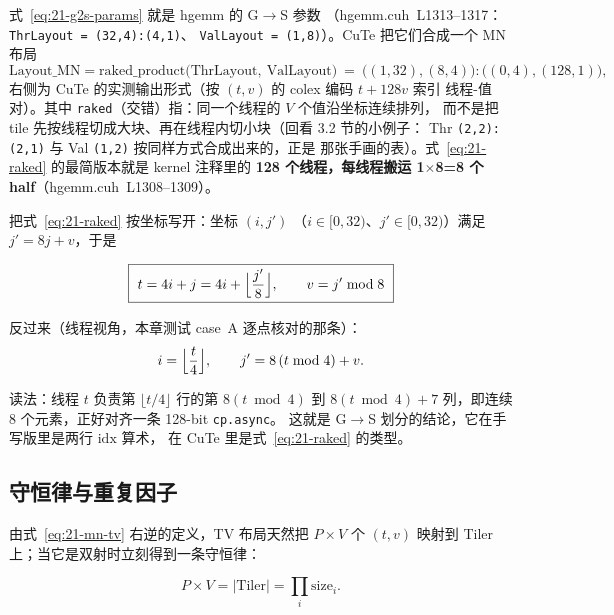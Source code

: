 式~\eqref{eq:21-g2s-params} 就是 hgemm 的 G$\to$S 参数
（hgemm.cuh~L1313--1317：\texttt{Thr\allowbreak{}Layout\ =\allowbreak{}\ \allowbreak{}(32,\allowbreak{}4){:}\allowbreak{}(4,\allowbreak{}1)}、
\texttt{ValLayout\ =\ (1,8)}）。CuTe 把它们合成一个 MN 布局
\begin{equation}
  \mathrm{Layout\_MN} = \mathrm{raked\_product}\bigl(
    \mathrm{ThrLayout},\ \mathrm{ValLayout}\bigr)
  \ =\ \bigl((1,32),(8,4)\bigr){:}\bigl((0,4),(128,1)\bigr),
  \label{eq:21-raked}
\end{equation}
右侧为 CuTe 的实测输出形式（按 $(t,v)$ 的 colex 编码 $t+128v$ 索引
线程-值对）。其中 \texttt{raked}（交错）指：同一个线程的 $V$ 个值沿坐标连续排列，
而不是把 tile 先按线程切成大块、再在线程内切小块（回看 3.2 节的小例子：
Thr \texttt{(2,2):(2,1)} 与 Val \texttt{(1,2)} 按同样方式合成出来的，正是
那张手画的表）。式~\eqref{eq:21-raked} 的最简版本就是 kernel 注释里的
\textbf{128 个线程，每线程搬运 1$\times$8=8 个 half}（hgemm.cuh~L1308--1309）。

把式~\eqref{eq:21-raked} 按坐标写开：坐标 $(i,j')$
（$i\in[0,32)$、$j'\in[0,32)$）满足 $j' = 8j+v$，于是

\begin{equation}
  \boxed{\ t = 4i + j = 4i + \Bigl\lfloor \frac{j'}{8}\Bigr\rfloor,
  \qquad v = j' \bmod 8\ }
  \label{eq:21-g2s-mn}
\end{equation}

反过来（线程视角，本章测试 case~A 逐点核对的那条）：
\begin{equation}
  i = \Bigl\lfloor \frac{t}{4}\Bigr\rfloor,\qquad
  j' = 8\,(t \bmod 4) + v .
  \label{eq:21-g2s-tv}
\end{equation}

读法：线程 $t$ 负责第 $\lfloor t/4\rfloor$ 行的第 $8(t\bmod 4)$
到 $8(t\bmod 4)+7$ 列，即连续 8 个元素，正好对齐一条 128-bit \texttt{cp.async}。
这就是 G$\to$S 划分的结论，它在手写版里是两行 $\mathrm{idx}$ 算术，
在 CuTe 里是式~\eqref{eq:21-raked} 的类型。

\subsection{守恒律与重复因子}

由式~\eqref{eq:21-mn-tv} 右逆的定义，TV 布局天然把
$P\times V$ 个 $(t,v)$ 映射到 Tiler 上；当它是双射时立刻得到一条守恒律：

\begin{equation}
  P \times V = \bigl|\mathrm{Tiler}\bigr| = \prod_i \mathrm{size}_i .
  \label{eq:21-conserve}
\end{equation}

